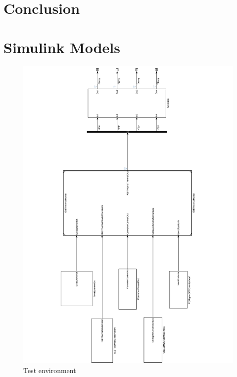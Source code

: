 \section{Conclusion}







%


\appendices
\section{Simulink Models}
\begin{figure}[!H]
\centering
\includegraphics[height=0.8\textwidth, angle = 270]{figures/IGBthermal_test_env.pdf}

\caption{Test environment}
\label{test_env}
\end{figure}

